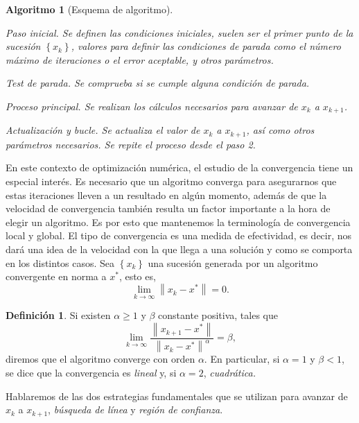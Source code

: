 \documentclass[11pt,a4paper]{book}
\newtheorem{algorithm}[theorem]{Algoritmo}
\theoremstyle{definition}
\newtheorem{definition}[theorem]{Definición}
\theoremstyle{remark}
\newcommand{\norm}[1]{\left\lVert#1\right\rVert}
\newcommand{\sucesionxk}{\left\{x_k\right\}}
\begin{document}
\begin{algorithm}[Esquema de algoritmo] \leavevmode
	\label{alg:esquema}
	\begin{steps}
		\item Paso inicial. Se definen las condiciones iniciales, suelen ser el primer
		punto de la sucesión $\sucesionxk$, valores para definir las condiciones de
		parada como el número máximo de iteraciones o el error aceptable, y otros parámetros.
		\item Test de parada. Se comprueba si se cumple alguna condición de parada.
		\item Proceso principal. Se realizan los cálculos necesarios para avanzar de
		$x_k$ a $x_{k+1}$.
		\item Actualización y bucle. Se actualiza el valor de $x_k$ a $x_{k+1}$, así como otros parámetros necesarios. Se repite el proceso desde el \textit{paso 2.}
	\end{steps}
\end{algorithm}

En este contexto de optimización numérica, el estudio de la convergencia tiene un especial interés. Es necesario que un algoritmo converga para asegurarnos que estas iteraciones lleven a un resultado en algún momento, además de que la velocidad de convergencia también resulta un factor importante a la hora de elegir un algoritmo.
Es por esto que mantenemos la terminología de convergencia local y global. El tipo de convergencia es una medida
de efectividad, es decir, nos dará una idea de la velocidad con la que llega a una solución y como se comporta en los distintos casos. Sea
$\sucesionxk$ una sucesión generada por un algoritmo convergente en norma a $x^*$, esto es,
\begin{equation}
	\lim_{k \to \infty} \norm{x_k-x^*} = 0.
\end{equation}
\begin{definition}
Si existen $\alpha\geq 1$ y $\beta$ constante positiva, tales que
\begin{equation}
	\lim_{k \to \infty} \frac{\norm{x_{k+1}-x^*}}{\norm{x_k-x^*}^\alpha}=\beta,
\end{equation}
diremos que el algoritmo converge con orden $\alpha$. En particular, si $\alpha=1$
y $\beta<1$, se dice que la convergencia es \textit{lineal} y, si $\alpha=2$,
\textit{cuadrática.}
\end{definition}

Hablaremos de las dos estrategias fundamentales que se utilizan para
avanzar de $x_k$ a $x_{k+1}$, \textit{búsqueda de línea} y \textit{región de confianza}.
\end{document}
